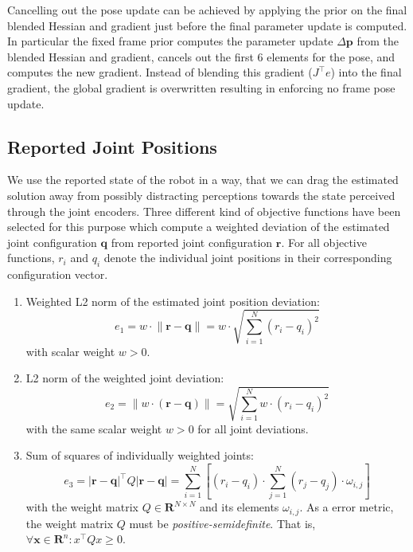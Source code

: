 Cancelling out the pose update can be achieved by applying the prior on the final blended Hessian and gradient just before the final parameter update is computed. In particular the fixed frame prior computes the parameter update $\Delta\mathbf{p}$ from the blended Hessian and gradient, cancels out the first 6 elements for the pose, and computes the new gradient. Instead of blending this gradient ($J^\top e$) into the final gradient, the global gradient is overwritten resulting in enforcing no frame pose update.


\subsection{Reported Joint Positions}

We use the reported state of the robot in a way, that we can drag the estimated solution away from possibly distracting perceptions towards the state perceived through the joint encoders.
%
Three different kind of objective functions have been selected for this purpose which compute a weighted deviation of the estimated joint configuration $\mathbf{q}$ from reported joint configuration $\mathbf{r}$. For all objective functions, $r_i$ and $q_i$ denote the individual joint positions in their corresponding configuration vector.

\begin{enumerate}
\item Weighted L2 norm of the estimated joint position deviation:
\begin{equation}
e_1 = w \cdot \lVert \mathbf{r} - \mathbf{q} \rVert = w \cdot \sqrt{\sum_{i=1}^N (r_i - q_i)^2} \label{eqn:objf_weightedL2}
\end{equation}
with scalar weight $w>0$.

\item L2 norm of the weighted joint deviation:
\begin{equation}
e_2 = \lVert w \cdot (\mathbf{r} - \mathbf{q}) \rVert = \sqrt{\sum_{i=1}^N w \cdot (r_i - q_i)^2} \label{eqn:objf_L2ofweighted}
\end{equation}
with the same scalar weight $w>0$ for all joint deviations.

\item Sum of squares of individually weighted joints:
\begin{equation}
e_3 = \lvert \mathbf{r} - \mathbf{q} \rvert^\top Q \lvert \mathbf{r} - \mathbf{q} \rvert = \sum_{i=1}^N \left[ (r_i-q_i) \cdot \sum_{j=1}^N (r_j-q_j) \cdot \omega_{i,j} \right] \label{eqn:objf_indiv_weighted}
\end{equation}
with the weight matrix $Q\in\mathbf{R}^{N\times N}$ and its elements $\omega_{i,j}$. As a error metric, the weight matrix $Q$ must be \emph{positive-semidefinite}. That is, $\forall \mathbf{x}\in\mathbf{R}^n: x^\top Q x \geq 0$.
\end{enumerate}

